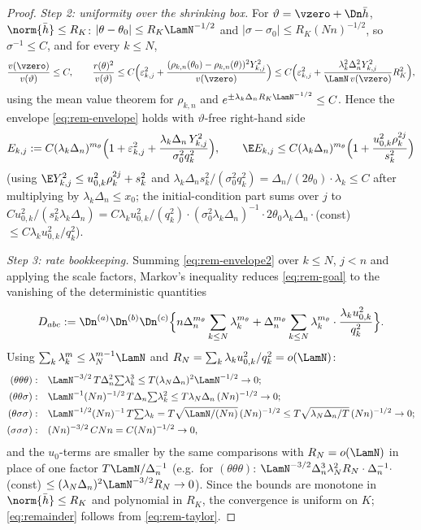\begin{proof}
\emph{Step 2: uniformity over the shrinking box.}
For $\vartheta=\vzero+\Dn\bar h$, $\norm{\bar h}\le R_K$:
$|\theta-\theta_0|\le R_K\LamN^{-1/2}$ and
$|\sigma-\sigma_0|\le R_K(Nn)^{-1/2}$, so
$\sigma^{-1}\le C$, and for every $k\le N$,
\[
 \frac{v(\vzero)}{v(\vartheta)}\le C,
 \qquad
 \frac{r(\theta)^2}{v(\vartheta)}
 \le C\Big(\varepsilon_{k,j}^2
 +\frac{(\rho_{k,n}(\theta_0)-\rho_{k,n}(\theta))^2Y_{k,j}^2}{v(\vzero)}\Big)
 \le C\Big(\varepsilon_{k,j}^2
 +\frac{\lambda_k^2\Delta_n^2Y_{k,j}^2}{\LamN\,v(\vzero)}R_K^2\Big),
\]
using the mean value theorem for $\rho_{k,n}$ and
$e^{\pm\lambda_k\Delta_nR_K\LamN^{-1/2}}\le C$. Hence the envelope
\eqref{eq:rem-envelope} holds with $\vartheta$-free right-hand side
\begin{equation}\label{eq:rem-envelope2}
 E_{k,j}
 :=C(\lambda_k\Delta_n)^{m_\theta}
 \Big(1+\varepsilon_{k,j}^2
 +\frac{\lambda_k\Delta_n\,Y_{k,j}^2}{\sigma_0^2q_k^2}\Big),
 \qquad
 \E E_{k,j}\le C(\lambda_k\Delta_n)^{m_\theta}
 \Big(1+\frac{u_{0,k}^2\rho_k^{2j}}{s_k^2}\Big)
\end{equation}
(using $\E Y_{k,j}^2\le u_{0,k}^2\rho_k^{2j}+s_k^2$ and
$\lambda_k\Delta_n s_k^2/(\sigma_0^2q_k^2)=\Delta_n/(2\theta_0)\cdot
\lambda_k\le C$ after multiplying by $\lambda_k\Delta_n\le x_0$; the
initial-condition part sums over $j$ to
$Cu_{0,k}^2/(s_k^2\lambda_k\Delta_n)
=C\lambda_ku_{0,k}^2/(q_k^2)\cdot(\sigma_0^2\lambda_k\Delta_n)^{-1}\cdot
2\theta_0\lambda_k\Delta_n\cdot$(const)$\le C\lambda_ku_{0,k}^2/q_k^2$).

\emph{Step 3: rate bookkeeping.}
Summing \eqref{eq:rem-envelope2} over $k\le N$, $j<n$ and applying the scale
factors, Markov's inequality reduces \eqref{eq:rem-goal} to the vanishing of
the deterministic quantities
\[
 D_{abc}:=\Dn^{(a)}\Dn^{(b)}\Dn^{(c)}
 \Big\{n\Delta_n^{m_\theta}\sum_{k\le N}\lambda_k^{m_\theta}
 +\Delta_n^{m_\theta}\sum_{k\le N}\lambda_k^{m_\theta}
 \cdot\frac{\lambda_ku_{0,k}^2}{q_k^2}\Big\}.
\]
Using $\sum_k\lambda_k^m\le\lambda_N^{m-1}\LamN$ and
$R_N=\sum_k\lambda_ku_{0,k}^2/q_k^2=o(\LamN)$:
\begin{align*}
 (\theta\theta\theta):\quad
 &\LamN^{-3/2}\,T\Delta_n^2{\textstyle\sum}\lambda_k^3
 \le T(\lambda_N\Delta_n)^2\LamN^{-1/2}\to0;\\
 (\theta\theta\sigma):\quad
 &\LamN^{-1}(Nn)^{-1/2}\,T\Delta_n{\textstyle\sum}\lambda_k^2
 \le T\lambda_N\Delta_n\,(Nn)^{-1/2}\to0;\\
 (\theta\sigma\sigma):\quad
 &\LamN^{-1/2}(Nn)^{-1}\,T{\textstyle\sum}\lambda_k
 =T\sqrt{\LamN/(Nn)}\,(Nn)^{-1/2}
 \le T\sqrt{\lambda_N\Delta_n/T}\,(Nn)^{-1/2}\to0;\\
 (\sigma\sigma\sigma):\quad
 &(Nn)^{-3/2}\,CNn=C(Nn)^{-1/2}\to0,
\end{align*}
and the $u_0$-terms are smaller by the same comparisons with
$R_N=o(\LamN)$ in place of one factor $T\LamN/\Delta_n^{-1}$
(e.g.\ for $(\theta\theta\theta)$:
$\LamN^{-3/2}\Delta_n^3\lambda_N^2R_N\cdot\Delta_n^{-1}\cdot$(const)
$\le(\lambda_N\Delta_n)^2\LamN^{-3/2}R_N\to0$).
Since the bounds are monotone in $\norm{\bar h}\le R_K$ and polynomial in
$R_K$, the convergence is uniform on $K$; \eqref{eq:remainder} follows from
\eqref{eq:rem-taylor}.
\end{proof}
